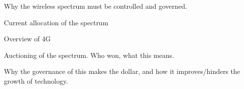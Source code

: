 {}


Why the wireless spectrum must be controlled and governed. 

Current allocation of the spectrum

Overview of 4G

Auctioning of the spectrum. 
Who won, what this means.

Why the governance of this makes the dollar, and how it improves/hinders the growth of technology.


